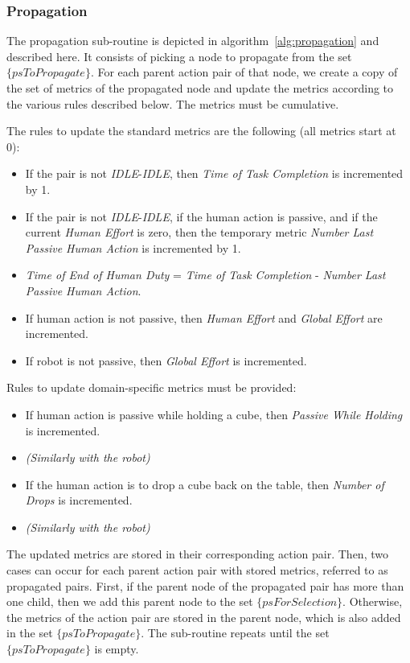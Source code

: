    \subsubsection{Propagation}

The propagation sub-routine is depicted in algorithm~\ref{alg:propagation} and described here. It consists of picking a node to propagate from the set $\{psToPropagate\}$. For each parent action pair of that node, we create a copy of the set of metrics of the propagated node and update the metrics according to the various rules described below.
The metrics must be cumulative. 

The rules to update the standard metrics are the following (all metrics start at 0):
\vspace{-\topsep}
\begin{itemize}
    \setlength\itemsep{-0.3em}
    \item If the pair is not \textit{IDLE}-\textit{IDLE}, then \textit{Time of Task Completion} is incremented by 1.
    \item If the pair is not \textit{IDLE}-\textit{IDLE}, if the human action is passive, and if the current \textit{Human Effort} is zero, then the temporary metric \textit{Number Last Passive Human Action} is incremented by 1.
    \item \textit{Time of End of Human Duty} = \textit{Time of Task Completion} - \textit{Number Last Passive Human Action}.
    \item If human action is not passive, then \textit{Human Effort} and \textit{Global Effort} are incremented.
    \item If robot is not passive, then \textit{Global Effort} is incremented.
\end{itemize}
Rules to update domain-specific metrics must be provided:
\vspace{-\topsep}
\begin{itemize}
    \setlength\itemsep{-0.3em}
    \item If human action is passive while holding a cube, then \textit{Passive While Holding} is incremented.
    \item \textit{(Similarly with the robot)}
    \item If the human action is to drop a cube back on the table, then \textit{Number of Drops} is incremented.
    \item \textit{(Similarly with the robot)}
\end{itemize}

The updated metrics are stored in their corresponding action pair. Then, two cases can occur for each parent action pair with stored metrics, referred to as propagated pairs. First, if the parent node of the propagated pair has more than one child, then we add this parent node to the set $\{psForSelection\}$. Otherwise, the metrics of the action pair are stored in the parent node, which is also added in the set $\{psToPropagate\}$. 
The sub-routine repeats until the set $\{psToPropagate\}$ is empty.

